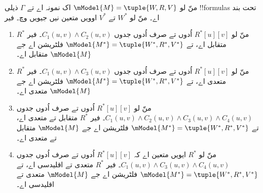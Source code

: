 \documentclass[../../../include/open-logic-section]{subfiles}
\begin{document}
\begin{thm}
  منّ لو $\mModel{M} =\tuple{W,R,V}$ اک نمونہ اے تے $\Gamma$ ذیلی !!{formula}s تحت بند اے۔ منّ لو $W^*$ تے $V^*$ اوویں متعین نیں جیویں
   وچ۔ فیر
  \begin{enumerate}
  \item منّ لو $R^*[u][v]$ اُدوں تے صرف اُدوں جدوں $C_1(u, v) \land
    C_2(u,v)$۔ فیر $R^*$ متقابل اے، تے $\mModel{M^*} =
    \tuple{W^*,R^*,V^*}$ فلٹریشن اے جے $\mModel{M}$ متقابل اے۔
  \item منّ لو $R^*[u][v]$ اُدوں تے صرف اُدوں جدوں $C_1(u, v)
    \land C_3(u,v)$۔ فیر $R^*$ متعدی اے، تے
    $\mModel{M^*}=\tuple{W^*,R^*,V^*}$ فلٹریشن اے جے $\mModel{M}$
    متعدی اے۔
  \item منّ لو $R^*[u][v]$ اُدوں تے صرف اُدوں جدوں $C_1(u, v) \land C_2(u,v)
    \land C_3(u,v) \land C_4(u,v)$۔ فیر $R^*$ متقابل تے متعدی اے، تے
    $\mModel{M^*}=\tuple{W^*,R^*,V^*}$ فلٹریشن اے جے $\mModel{M}$ متقابل تے متعدی اے۔
  \item منّ لو $R^*$ ایویں متعین اے کہ $R^*[u][v]$ اُدوں تے صرف اُدوں جدوں $C_1(u,
    v) \land C_3(u,v) \land C_4(u,v)$۔ فیر $R^*$ متعدی تے اقلیدسی اے، تے
    $\mModel{M^*}=\tuple{W^*,R^*,V^*}$ فلٹریشن اے جے $\mModel{M}$ متعدی تے اقلیدسی اے۔
  \end{enumerate}
\end{thm}
\end{document}

